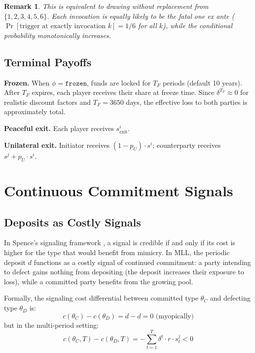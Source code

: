 \documentclass[12pt,a4paper]{article}
\newtheorem{remark}{Remark}
\begin{document}
\begin{remark}
This is equivalent to drawing without replacement from $\{1,2,3,4,5,6\}$. Each invocation is equally likely to be the fatal one ex ante ($\Pr[\text{trigger at exactly invocation } k] = 1/6$ for all $k$), while the conditional probability monotonically increases.
\end{remark}

\subsection{Terminal Payoffs}

\textbf{Frozen.} When $\phi = \texttt{frozen}$, funds are locked for $T_F$ periods (default 10 years). After $T_F$ expires, each player receives their share at freeze time. Since $\delta^{T_F} \approx 0$ for realistic discount factors and $T_F = 3650$ days, the effective loss to both parties is approximately total.

\textbf{Peaceful exit.} Each player receives $s_{\text{exit}}^i$.

\textbf{Unilateral exit.} Initiator receives $(1-p_U) \cdot s^i$; counterparty receives $s^j + p_U \cdot s^i$.



\section{Continuous Commitment Signals}
\label{sec:continuous}

\subsection{Deposits as Costly Signals}

In Spence's signaling framework \citep{spence1973}, a signal is credible if and only if its cost is higher for the type that would benefit from mimicry. In MLL, the periodic deposit $d$ functions as a costly signal of continued commitment: a party intending to defect gains nothing from depositing (the deposit increases their exposure to loss), while a committed party benefits from the growing pool.

Formally, the signaling cost differential between committed type $\theta_C$ and defecting type $\theta_D$ is:
\[
c(\theta_C) - c(\theta_D) = d - d = 0 \text{ (myopically)}
\]
but in the multi-period setting:
\[
c(\theta_C, T) - c(\theta_D, T) = -\sum_{t=1}^{T} \delta^t \cdot r \cdot s_t^j < 0
\]
\end{document}
